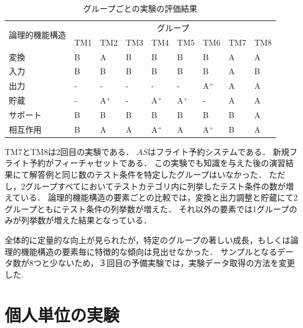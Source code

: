 \begin{table}[htbp]
\footnotesize
  \centering
  \caption{グループごとの実験の評価結果}
    \begin{tabular}{|l|l|l|l|l|l|l|l|l|}
    \hline
    \multicolumn{1}{|c|}{\multirow{2}[4]{*}{論理的機能構造}} & \multicolumn{8}{c|}{グループ} \bigstrut\\
\cline{2-9}          & TM1   & TM2   & TM3   & TM4   & TM5   & TM6 & TM7 & TM8 \bigstrut\\
    \hline
    \hline
    変換  & B     & A     & B     & B     & B     & B & A     & A\bigstrut\\
    \hline
    入力 &  B     &  B    & B    & B    &  B    & B    & A     & B   \bigstrut\\
    \hline
    出力 & -     & -     & -     & -     & -     & A${}^\text{+}$ & A     & A \bigstrut\\
    \hline
    貯蔵 & -     & A${}^\text{+}$    & -     & A${}^\text{+}$    & A${}^\text{+}$    & -& A     & A  \bigstrut\\
    \hline
    サポート & B     & B     & B     & B     & B     & B& B     & A \bigstrut[t]\\
    \hline
    相互作用  & B     & A     & A     & A${}^\text{+}$    & A     & A${}^\text{+}$& B     & A \bigstrut[b]\\
    \hline
    \end{tabular}%
  \label{tab:D-3-tab5}%
\end{table}%

TM7とTM8は2回目の実験である．
$AS$はフライト予約システムである．
新規フライト予約がフィーチャセットである．
この実験でも知識を与えた後の演習結果にて解答例と同じ数のテスト条件を特定したグループはいなかった．
ただし，2グループすべてにおいてテストカテゴリ内に列挙したテスト条件の数が増えている．
論理的機能構造の要素ごとの比較では，変換と出力調整と貯蔵にて2グループともにテスト条件の列挙数が増えた．
それ以外の要素では1グループのみが列挙数が増えた結果となっている．

全体的に定量的な向上が見られたが，特定のグループの著しい成長，もしくは論理的機能構造の要素毎に特徴的な傾向は見出せなかった．
サンプルとなるデータ数が8つと少ないため，３回目の予備実験では，実験データ取得の方法を変更した.

\newpage
\section{個人単位の実験}
